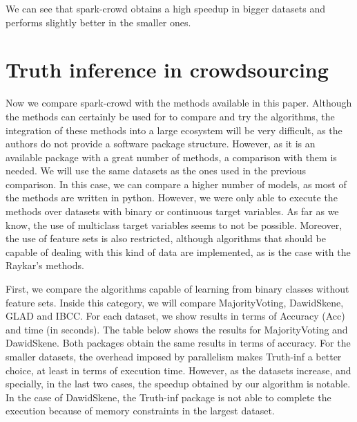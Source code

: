 \documentclass[letterpaper,10pt,english]{sphinxmanual}
\begin{document}
We can see that spark-crowd obtains a high speedup in bigger datasets and performs
slightly better in the smaller ones.


\section{Truth inference in crowdsourcing}
\label{\detokenize{package/other:id2}}
Now we compare spark-crowd with the methods available in this paper. Although the methods
can certainly be used for to compare and try the algorithms, the integration of these
methods into a large ecosystem will be very difficult, as the authors do not provide
a software package structure. However, as it is an available package with a great number
of methods, a comparison with them is needed. We will use the same datasets
as the ones used in the previous comparison. In this case, we can compare a higher
number of models, as most of the methods are written in python. However, we were only able
to execute the methods over datasets with binary or continuous target variables. As far as we
know, the use of multiclass target variables seems to not be possible. Moreover, the use of
feature sets is also restricted, although algorithms that should be capable of dealing with
this kind of data are implemented, as is the case with the Raykar’s methods.

First, we compare the algorithms capable of learning from binary classes without feature sets.
Inside this category, we will compare MajorityVoting, DawidSkene, GLAD and IBCC. For each dataset, we show
results in terms of Accuracy (Acc) and time (in seconds). The table below shows the results for
MajorityVoting and DawidSkene. Both packages obtain the same results in terms of
accuracy. For the smaller datasets, the overhead imposed by parallelism makes Truth-inf a better choice,
at least in terms of execution time. However, as the datasets increase, and specially, in the last two
cases, the speedup obtained by our algorithm is notable. In the case of DawidSkene, the Truth-inf
package is not able to complete the execution because of memory constraints in the largest dataset.
\end{document}
